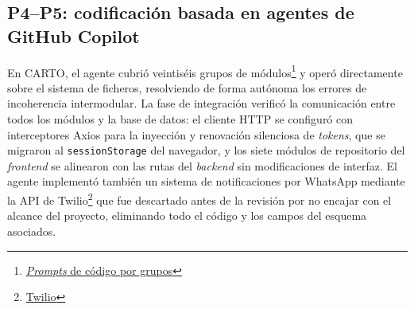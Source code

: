 \subsection{P4--P5: codificación basada en agentes de GitHub Copilot}

En \ac{CARTO}, el agente cubrió veintiséis grupos de módulos\footnote{\href{https://github.com/alu0101549491/TFG-Fabian-Gonzalez-Lence/tree/main/resources/prompts/4-CartographicProjectManager/3-CodigoPorGruposdeModulos}{\textit{Prompts} de código por grupos}} y operó directamente sobre el sistema de ficheros, resolviendo de forma autónoma los errores de incoherencia intermodular. La fase de integración verificó la comunicación entre todos los módulos y la base de datos: el cliente HTTP se configuró con interceptores Axios para la inyección y renovación silenciosa de \textit{tokens}, que se migraron al \texttt{sessionStorage} del navegador, y los siete módulos de repositorio del \textit{frontend} se alinearon con las rutas del \textit{backend} sin modificaciones de interfaz. El agente implementó también un sistema de notificaciones por WhatsApp mediante la \ac{API} de Twilio\footnote{\href{https://www.twilio.com/en-us/messaging/channels/whatsapp?cq_plac=&cq_net=g&cq_pos=&cq_med=&cq_plt=gp&gad_campaignid=23476018559}{Twilio}} que fue descartado antes de la revisión por no encajar con el alcance del proyecto, eliminando todo el código y los campos del esquema asociados.\\

